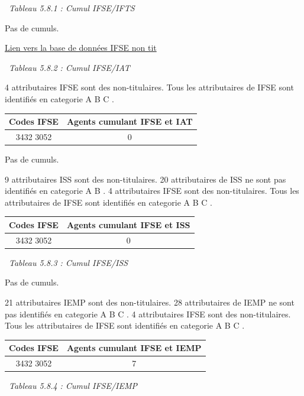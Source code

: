 ~\emph{Tableau 5.8.1 : Cumul IFSE/IFTS}

Pas de cumuls.

\href{../Bases/Reglementation/IFSE.non.tit.csv}{Lien vers la base de
données IFSE non tit}

~\emph{Tableau 5.8.2 : Cumul IFSE/IAT}

4 attributaires IFSE sont des non-titulaires. Tous les attributaires de
IFSE sont identifiés en categorie A B C .

\begin{longtable}[]{@{}cc@{}}
\toprule
Codes IFSE & Agents cumulant IFSE et IAT\tabularnewline
\midrule
\endhead
3432 3052 & 0\tabularnewline
\bottomrule
\end{longtable}

Pas de cumuls.

9 attributaires ISS sont des non-titulaires. 20 attributaires de ISS ne
sont pas identifiés en categorie A B . 4 attributaires IFSE sont des
non-titulaires. Tous les attributaires de IFSE sont identifiés en
categorie A B C .

\begin{longtable}[]{@{}cc@{}}
\toprule
Codes IFSE & Agents cumulant IFSE et ISS\tabularnewline
\midrule
\endhead
3432 3052 & 0\tabularnewline
\bottomrule
\end{longtable}

~\emph{Tableau 5.8.3 : Cumul IFSE/ISS}

Pas de cumuls.

21 attributaires IEMP sont des non-titulaires. 28 attributaires de IEMP
ne sont pas identifiés en categorie A B C . 4 attributaires IFSE sont
des non-titulaires. Tous les attributaires de IFSE sont identifiés en
categorie A B C .

\begin{longtable}[]{@{}cc@{}}
\toprule
Codes IFSE & Agents cumulant IFSE et IEMP\tabularnewline
\midrule
\endhead
3432 3052 & 7\tabularnewline
\bottomrule
\end{longtable}

~\emph{Tableau 5.8.4 : Cumul IFSE/IEMP}

